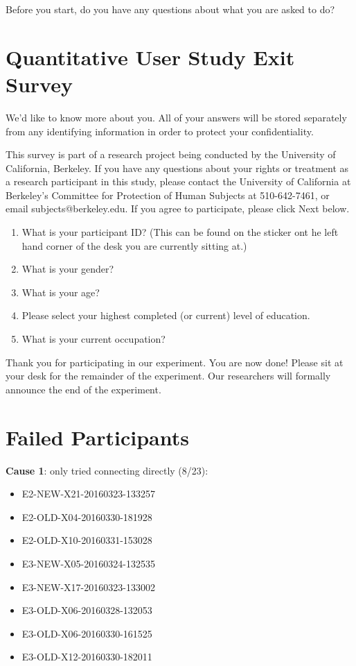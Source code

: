 \documentclass[USenglish,oneside,twocolumn]{article}
\begin{document}
Before you start, do you have any questions about what you are asked to do? 

\section{Quantitative User Study Exit Survey} 
\label{quantitative-exit-survey}
We'd like to know more about you.  All of your answers will be stored separately from any identifying information in order to protect your confidentiality.

This survey is part of a research project being conducted by the University of California, Berkeley. If you have any questions about your rights or treatment as a research participant in this study, please contact the University of California at Berkeley's Committee for Protection of Human Subjects at 510-642-7461, or email subjects@berkeley.edu. If you agree to participate, please click Next below.\\

\begin{enumerate}
\item{What is your participant ID? (This can be found on the sticker ont he left hand corner of the desk you are currently sitting at.)}
\item{What is your gender?}
\item{What is your age?}
\item{Please select your highest completed (or current) level of education}.
\item{What is your current occupation?}  
\end{enumerate}

Thank you for participating in our experiment. You are now done! Please sit at your desk for the remainder of the experiment. Our researchers will formally announce the end of the experiment. 

\section{Failed Participants} 
\label{failed-participants}

{\bfseries Cause 1}: only tried connecting directly (8/23): 
\begin{itemize}
\item E2-NEW-X21-20160323-133257 
\item E2-OLD-X04-20160330-181928
\item E2-OLD-X10-20160331-153028
\item E3-NEW-X05-20160324-132535
\item E3-NEW-X17-20160323-133002
\item E3-OLD-X06-20160328-132053
\item E3-OLD-X06-20160330-161525 
\item E3-OLD-X12-20160330-182011
\end{itemize} 
\end{document}
